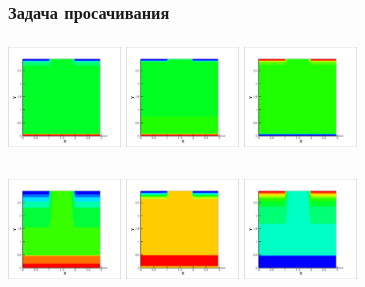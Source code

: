 \documentclass[10pt,pdf,hyperref={unicode}]{beamer} %
\begin{document}
\begin{frame}
\frametitle{Задача просачивания}
\begin{center}
 \includegraphics[width=3cm,height=3cm]{test2_1Sw}
 \includegraphics[width=3cm,height=3cm]{test2_1Sn}
 \includegraphics[width=3cm,height=3cm]{test2_1Sg}
\end{center}
\begin{center}
  \includegraphics[width=3cm,height=3cm]{test2_4Sw}
 \includegraphics[width=3cm,height=3cm]{test2_4Sn}
 \includegraphics[width=3cm,height=3cm]{test2_4Sg}
\end{center}
\begin{center}
\end{center}
\end{frame}
\end{document}

